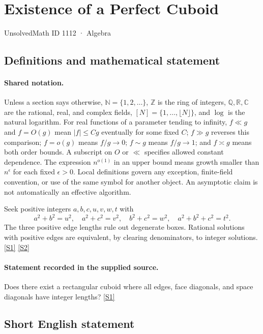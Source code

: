 \documentclass[11pt,a4paper]{article}
\newcommand{\N}{\mathbb{N}}
\newcommand{\Z}{\mathbb{Z}}
\newcommand{\Q}{\mathbb{Q}}
\newcommand{\R}{\mathbb{R}}
\newcommand{\C}{\mathbb{C}}
\newcommand{\sref}[2]{\hyperlink{source:#1:#2}{[S#2]}}
\begin{document}

\setcounter{section}{1111}

\section{Existence of a Perfect Cuboid}\label{1112}

{\small\sffamily UnsolvedMath ID 1112 · Algebra}

\subsection{Definitions and mathematical statement}

\paragraph{Shared notation.}Unless a section says otherwise, $\N=\{1,2,\ldots\}$,
$\Z$ is the ring of integers, $\Q,\R,\C$ are the rational, real, and complex
fields, $[N]=\{1,\ldots,\lfloor N\rfloor\}$, and $\log$ is the natural
logarithm. For real functions of a parameter tending to infinity,
$f\ll g$ and $f=O(g)$ mean $|f|\leq Cg$ eventually for some fixed $C$;
$f\gg g$ reverses this comparison; $f=o(g)$ means $f/g\to0$;
$f\sim g$ means $f/g\to1$; and $f\asymp g$ means both order bounds.
A subscript on $O$ or $\ll$ specifies allowed constant dependence.
The expression $n^{o(1)}$ in an upper bound means growth smaller than
$n^\epsilon$ for each fixed $\epsilon>0$. Local definitions govern any
exception, finite-field convention, or use of the same symbol for another
object. An asymptotic claim is not automatically an effective algorithm.



Seek positive integers $a,b,c,u,v,w,t$ with
\[a^2+b^2=u^2,\quad a^2+c^2=v^2,\quad b^2+c^2=w^2,\quad a^2+b^2+c^2=t^2.\]
The three positive edge lengths rule out degenerate boxes. Rational solutions with positive edges are equivalent, by clearing denominators, to integer solutions. \sref{1112}{1} \sref{1112}{2}

\paragraph{Statement recorded in the supplied source.}
Does there exist a rectangular cuboid where all edges, face diagonals, and space diagonals have integer lengths? \sref{1112}{1}

\subsection{Short English statement}
\end{document}
